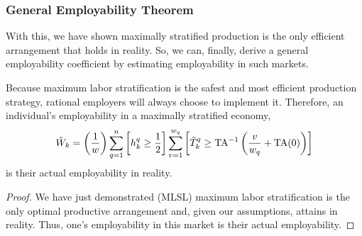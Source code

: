 \documentclass[hidelinks, nonatbib]{elsarticle}
\begin{document}
\subsubsection{General Employability Theorem}
With this, we have shown maximally stratified production is the only efficient arrangement that holds in reality. So, we can, finally, derive a general employability coefficient by estimating employability in such markets.
\begin{get_theorem}[GET]
    Because maximum labor stratification is the safest and most efficient production strategy, rational employers will always choose to implement it. Therefore, an individual's employability in a maximally stratified economy,
    \begin{gather}
        \tilde{W}_k 
        =
        \left(
            \frac{1}{w}
        \right)
        \sum_{q=1}^{n}
        \left[
            h_{k}^{q}
            \geq
            \frac{1}{2}
        \right]
        \sum_{v=1}^{w_q}
        \left[
            \tilde{T}_{k}^{q}
            \geq
            \text{TA}^{-1}
            \left(
                \frac{v}{w_q}
                +
                \text{TA}(0)
            \right)
        \right]
    \end{gather}
    is their actual employability in reality.
    \begin{proof}
        We have just demonstrated (MLSL) maximum labor stratification is the only optimal productive arrangement and, given our assumptions, attains in reality. Thus, one's employability in this market is their actual employability.


\end{proof}
\end{get_theorem}
\end{document}
